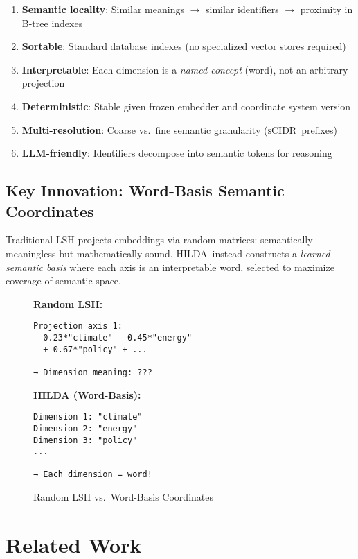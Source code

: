 \documentclass[11pt]{article}
\newcommand{\hilda}{\textsc{HILDA}}
\newcommand{\scidr}{\textsc{sCIDR}}
\begin{document}
\begin{enumerate}[leftmargin=2em]
  \item \textbf{Semantic locality}: Similar meanings $\to$ similar identifiers $\to$ proximity in B-tree indexes
  \item \textbf{Sortable}: Standard database indexes (no specialized vector stores required)
  \item \textbf{Interpretable}: Each dimension is a \emph{named concept} (word), not an arbitrary projection
  \item \textbf{Deterministic}: Stable given frozen embedder and coordinate system version
  \item \textbf{Multi-resolution}: Coarse vs.\ fine semantic granularity (\scidr\ prefixes)
  \item \textbf{LLM-friendly}: Identifiers decompose into semantic tokens for reasoning
\end{enumerate}

\subsection{Key Innovation: Word-Basis Semantic Coordinates}

Traditional LSH projects embeddings via random matrices: semantically meaningless but mathematically sound. \hilda\ instead constructs a \emph{learned semantic basis} where each axis is an interpretable word, selected to maximize coverage of semantic space.

\begin{figure}[h]
\centering
\begin{minipage}{0.48\textwidth}
\textbf{Random LSH:}
\begin{verbatim}
Projection axis 1:
  0.23*"climate" - 0.45*"energy"
  + 0.67*"policy" + ...
  
→ Dimension meaning: ???
\end{verbatim}
\end{minipage}
\hfill
\begin{minipage}{0.48\textwidth}
\textbf{HILDA (Word-Basis):}
\begin{verbatim}
Dimension 1: "climate"
Dimension 2: "energy"  
Dimension 3: "policy"
...

→ Each dimension = word!
\end{verbatim}
\end{minipage}
\caption{Random LSH vs.\ Word-Basis Coordinates}
\end{figure}

\section{Related Work}
\end{document}
